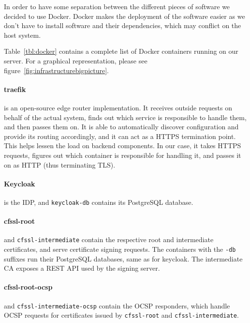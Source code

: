 In order to have some separation between the different pieces of software we decided to use Docker.
Docker makes the deployment of the software easier as we don't have to install software and their dependencies, which may conflict on the host system.

Table~\ref{tbl:docker} contains a complete list of Docker containers running on our server.
For a graphical representation, please see figure~\ref{fig:infrastructurebigpicture}.

\paragraph{traefik} is an open-source edge router implementation.
It receives outside requests on behalf of the actual system,
finds out which service is responsible to handle them,
and then passes them on.
It is able to automatically discover configuration and provide its routing accordingly,
and it can act as a \gls{HTTPS} termination point.
This helps lessen the load on backend components.
In our case, it takes \gls{HTTPS} requests, figures out which container is responsible for handling it,
and passes it on as \gls{HTTP} (thus terminating \gls{TLS}).


\paragraph{Keycloak} is the \gls{IDP}, and \texttt{keycloak-db} contains its PostgreSQL database.
\paragraph{cfssl-root} and \texttt{cfssl-intermediate} contain the respective root and intermediate certificates,
and serve certificate signing requests.
The containers with the \texttt{-db} suffixes run their PostgreSQL databases, same as for keycloak.
The intermediate \gls{CA} exposes a \gls{REST} \gls{API} used by the signing server.
\paragraph{cfssl-root-ocsp} and \texttt{cfssl-intermediate-ocsp} contain the \gls{OCSP} responders,
which handle \gls{OCSP} requests for certificates issued by \texttt{cfssl-root} and \texttt{cfssl-intermediate}.

